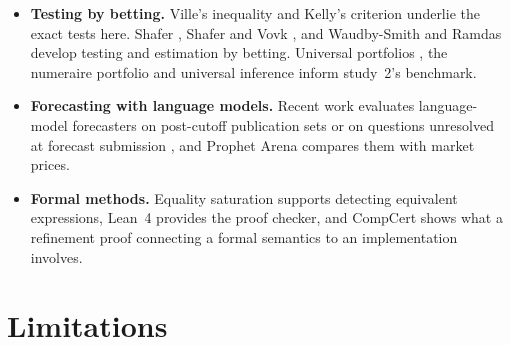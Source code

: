 \documentclass[11pt]{article}
\begin{document}
\begin{itemize}
  \item \textbf{Testing by betting.} Ville's inequality \cite{ville1939} and Kelly's criterion \cite{kelly1956} underlie the exact tests here. Shafer \cite{shafer2021}, Shafer and Vovk \cite{shafervovk2019}, and Waudby-Smith and Ramdas \cite{waudbysmith2024} develop testing and estimation by betting. Universal portfolios \cite{cover1991}, the numeraire portfolio \cite{long1990,covertom2006} and universal inference \cite{wasserman2020} inform study~2's benchmark.
  \item \textbf{Forecasting with language models.} Recent work evaluates language-model forecasters on post-cutoff publication sets \cite{halawi2024} or on questions unresolved at forecast submission \cite{karger2025}, and Prophet Arena \cite{prophetarena2025} compares them with market prices.
  \item \textbf{Formal methods.} Equality saturation \cite{willsey2021} supports detecting equivalent expressions, Lean~4 \cite{demoura2021} provides the proof checker, and CompCert \cite{leroy2009} shows what a refinement proof connecting a formal semantics to an implementation involves.
\end{itemize}

\section{Limitations}\label{sec:limits}
\end{document}
